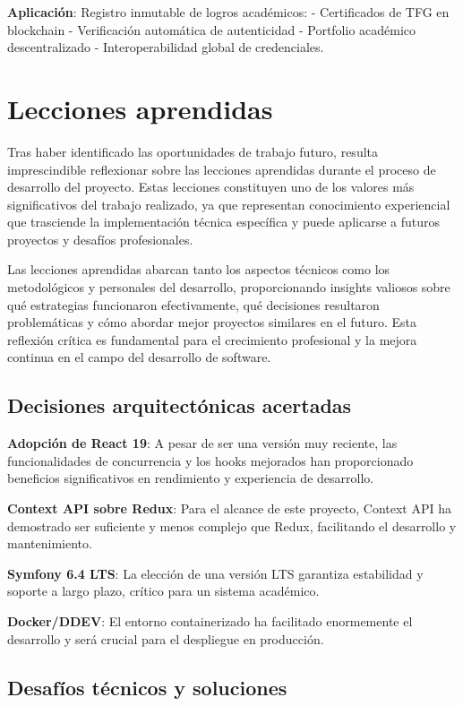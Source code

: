 \documentclass[12pt,a4paper,oneside]{report}
\begin{document}
{\textbf{Aplicación}: Registro inmutable de logros académicos: -
Certificados de TFG en blockchain - Verificación automática de
autenticidad - Portfolio académico descentralizado - Interoperabilidad
global de credenciales.

\section{Lecciones aprendidas}\label{lecciones-aprendidas}

Tras haber identificado las oportunidades de trabajo futuro, resulta
imprescindible reflexionar sobre las lecciones aprendidas durante el
proceso de desarrollo del proyecto. Estas lecciones constituyen uno de
los valores más significativos del trabajo realizado, ya que representan
conocimiento experiencial que trasciende la implementación técnica
específica y puede aplicarse a futuros proyectos y desafíos
profesionales.

Las lecciones aprendidas abarcan tanto los aspectos técnicos como los
metodológicos y personales del desarrollo, proporcionando insights
valiosos sobre qué estrategias funcionaron efectivamente, qué decisiones
resultaron problemáticas y cómo abordar mejor proyectos similares en el
futuro. Esta reflexión crítica es fundamental para el crecimiento
profesional y la mejora continua en el campo del desarrollo de software.

\subsection{Decisiones arquitectónicas
acertadas}\label{decisiones-arquitectuxf3nicas-acertadas}

\textbf{Adopción de React 19}: A pesar de ser una versión muy reciente,
las funcionalidades de concurrencia y los hooks mejorados han
proporcionado beneficios significativos en rendimiento y experiencia de
desarrollo.

\textbf{Context API sobre Redux}: Para el alcance de este proyecto,
Context API ha demostrado ser suficiente y menos complejo que Redux,
facilitando el desarrollo y mantenimiento.

\textbf{Symfony 6.4 LTS}: La elección de una versión LTS garantiza
estabilidad y soporte a largo plazo, crítico para un sistema académico.

\textbf{Docker/DDEV}: El entorno containerizado ha facilitado
enormemente el desarrollo y será crucial para el despliegue en
producción.

\subsection{Desafíos técnicos y
soluciones}\label{desafuxedos-tuxe9cnicos-y-soluciones}

}
\end{document}
